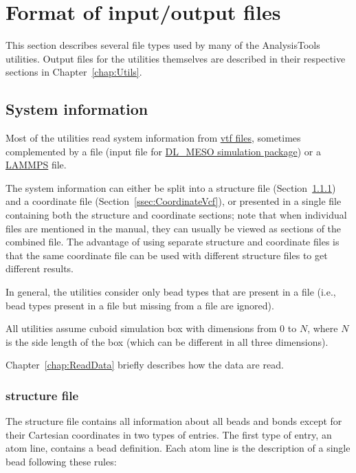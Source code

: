 \chapter{Format of input/output files}\label{chap:input}

This section describes several file types used by many of the
AnalysisTools utilities. Output files for the utilities themselves are
described in their respective sections in Chapter~\ref{chap:Utils}.

\section{System information} %
Most of the utilities read system information from
\href{https://github.com/olenz/vtfplugin/wiki/VTF-format}{vtf files},
sometimes complemented by a \field file (input file for
\href{https://www.scd.stfc.ac.uk/Pages/DL_MESO.aspx}{DL\_MESO simulation
package}) or a \href{https://lammps.sandia.gov/}{LAMMPS} \data file.

The system information can either be split into a \vsf structure file
(Section~\ref{ssec:StructureVsf}) and a \vcf coordinate file
(Section~\ref{ssec:CoordinateVcf}), or presented in a single \vtf file
containing both the structure and coordinate sections; note that when
individual \vscf files are mentioned in the manual, they can usually be
viewed as \vscf sections of the combined \vtf file. The advantage of
using separate structure and coordinate files is that the same coordinate
file can be used with different structure files to get different results.

In general, the utilities consider only bead types that are present in a
\vcf file (i.e., bead types present in a \vsf file but missing from a \vcf
file are ignored).

All utilities assume cuboid simulation box with dimensions from 0 to $N$,
where $N$ is the side length of the box (which can be different in all
three dimensions).

Chapter~\ref{chap:ReadData} briefly describes how the data are read.

\subsection{\vsf structure file} \label{ssec:StructureVsf} %

The structure file contains all information about all beads and bonds
except for their Cartesian coordinates in two types of entries. The first
type of entry, an atom line, contains a bead definition. Each atom line is
the description of a single bead following these rules:

